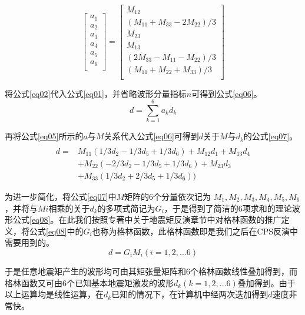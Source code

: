 \begin{equation}
\label{eq05}
\left[\begin{array}{c}
a_1\\
a_2\\
a_3\\
a_4\\
a_5\\
a_6\\
\end{array}\right]=
\left[\begin{array}{c}
M_{12}\\
(M_{11}+M_{33}-2M_{22})/3\\
M_{23}\\
M_{13}\\
(2M_{33}-M_{11}-M_{22})/3\\
(M_{11}+M_{22}+M_{33})/3\\
\end{array}\right]
\end{equation}

将公式\ref{eq02}代入公式\ref{eq01}，并省略波形分量指标$n$可得到公式\ref{eq06}。
\begin{equation}
\label{eq06}
d=\sum_{k=1}^{6}a_kd_k
\end{equation}

再将公式\ref{eq05}所示的$a$与$M$关系代入公式\ref{eq06}可得到$d$关于$M$与$d_k$的公式\ref{eq07}。
\begin{equation}
\label{eq07}
\begin{array}{rl}\\
d=&M_{11}(1/3d_2-1/3d_5+1/3d_6)+M_{12}d_1+M_{13}d_4\\
&+M_{22}(-2/3d_2-1/3d_5+1/3d_6)+M_{23}d_3\\
&+M_{33}(1/3d_2+2/3d_5+1/3d_6))
\end{array}
\end{equation}

为进一步简化，将公式\ref{eq07}中$M$矩阵的6个分量依次记为 $M_1,M_2,M_3,M_4,M_5,M_6$，并将与$Mi$相乘的关于$d_k$的多项式简记为$G_i$，于是得到了简洁的6项求和的理论波形公式\ref{eq08}。在此我们按照\citet{Stein2003}专著中关于地震矩反演章节中对格林函数的推广定义，将公式\ref{eq08}中的$G_i$也称为格林函数，此格林函数即是我们之后在CPS反演中需要用到的。
\begin{equation}
\label{eq08}
d=G_iM_i(i=1,2,...6)
\end{equation}

于是任意地震矩产生的波形均可由其矩张量矩阵和6个格林函数线性叠加得到，而格林函数又可由6个已知基本地震矩激发的波形$d_k(k=1,2,...6)$叠加得到。由于以上运算均是线性运算，在$d_k$已知的情况下，在计算机中经两次迭加得到$d$速度非常快。


